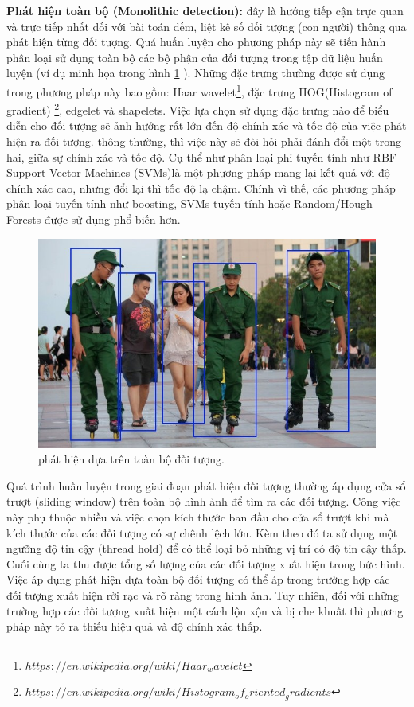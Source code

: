 \textbf{Phát hiện toàn bộ (Monolithic detection):} đây là hướng tiếp cận trực quan và trực tiếp nhất đối với bài toán đếm, liệt kê số đối tượng (con người) thông qua phát hiện từng đối tượng. Quá huấn luyện cho phương pháp này sẽ tiến hành phân loại sử dụng toàn bộ các bộ phận của đối tượng trong tập dữ liệu huấn luyện (ví dụ minh họa trong hình \ref{full_detect} ). Những đặc trưng thường được sử dụng trong phương pháp này bao gồm: Haar wavelet\footnote{$https://en.wikipedia.org/wiki/Haar_wavelet$}, đặc trưng HOG(Histogram of gradient) \footnote{$https://en.wikipedia.org/wiki/Histogram_of_oriented_gradients$}, edgelet và shapelets. Việc lựa chọn sử dụng đặc trưng nào để biểu diễn cho đối tượng sẽ ảnh hưởng rất lớn đến độ chính xác và tốc độ của việc phát hiện ra đối tượng. thông thường, thì việc này sẽ đòi hỏi phải đánh đổi một trong hai, giữa sự chính xác và tốc độ. Cụ thể như phân loại phi tuyến tính như RBF Support Vector Machines (SVMs)là một phương pháp mang lại kết quả với độ chính xác cao, nhưng đổi lại thì tốc độ lạ chậm. Chính vì thế, các phương pháp phân loại tuyến tính như boosting, SVMs tuyến tính hoặc Random/Hough Forests được sử dụng phổ biến hơn. \par
\begin{figure}
  			\begin{center}
    				
    				\includegraphics[scale=0.6]{full_detect}
    				\caption{phát hiện dựa trên toàn bộ đối tượng.} 
    				\label{full_detect}
  			\end{center}
\end{figure} 	
	Quá trình huấn luyện trong giai đoạn phát hiện đối tượng thường áp dụng cửa sổ trượt (sliding window) trên toàn bộ hình ảnh để tìm ra các đối tượng. Công việc này phụ thuộc nhiều và việc chọn kích thước ban đầu cho cửa sổ trượt khi mà kích thước của các đối tượng có sự chênh lệch lớn. Kèm theo đó ta sử dụng một ngưỡng độ tin cậy (thread hold) để có thể loại bỏ những vị trí có độ tin cậy thấp. Cuối cùng ta thu được tổng số lượng của các đối tượng xuất hiện trong bức hình. Việc áp dụng phát hiện dựa toàn bộ đối tượng có thể áp trong trường hợp các đối tượng xuất hiện rời rạc và rõ ràng trong hình ảnh. Tuy nhiên, đối với những trường hợp các đối tượng xuất hiện một cách lộn xộn và bị che khuất thì phương pháp này tỏ ra thiếu hiệu quả và độ chính xác thấp. \par 
	
